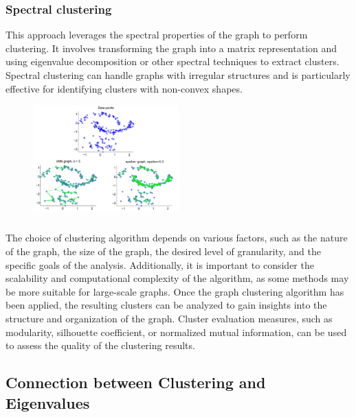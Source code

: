 \documentclass[12pt, a4paper]{article}
\begin{document}
\begin{flushleft}
        \subsubsection{Spectral clustering}
        \begin{flushleft}
            This approach leverages the spectral properties of the graph to perform clustering. It involves transforming the graph into a matrix representation and using eigenvalue decomposition or other spectral techniques to extract clusters. Spectral clustering can handle graphs with irregular structures and is particularly effective for identifying clusters with non-convex shapes.
            \begin{figure}[h]
            \centering
            \includegraphics[width=0.5\textwidth]{spectral_based.png}
            \end{figure}
        \end{flushleft}

        \subsubsection*{}
        \begin{flushleft}
        The choice of clustering algorithm depends on various factors, such as the nature of the graph, the size of the graph, the desired level of granularity, and the specific goals of the analysis. Additionally, it is important to consider the scalability and computational complexity of the algorithm, as some methods may be more suitable for large-scale graphs. Once the graph clustering algorithm has been applied, the resulting clusters can be analyzed to gain insights into the structure and organization of the graph. Cluster evaluation measures, such as modularity, silhouette coefficient, or normalized mutual information, can be used to assess the quality of the clustering results.
        \end{flushleft} 

        \subsection{Connection between Clustering and Eigenvalues}


\end{flushleft}
\end{document}
